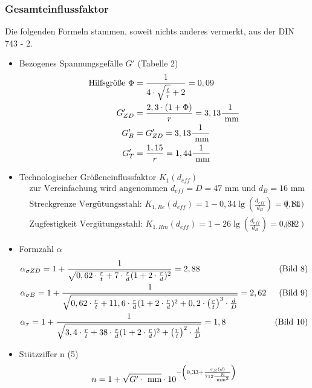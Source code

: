 \subsubsection{Gesamteinflussfaktor}
Die folgenden Formeln stammen, soweit nichts anderes vermerkt, aus der DIN 743 - 2.
\begin{itemize}
\item Bezogenes Spannungsgefälle $G'$ \hfill (Tabelle 2)
	\begin{align*}
		\text{Hilfsgröße } \Phi &= \frac{1}{4 \cdot \sqrt{\frac{t}{r}} +2} = 0,09 \\
		G'_{ZD} &= \frac{2,3 \cdot (1+\Phi)}{r} = 3,13 \frac{1}{\text{ mm}} \\
		G'_{B}&= G'_{ZD}  =3,13 \frac{1}{\text{ mm}} \\
		G'_{T}&= \frac{1,15}{r} = 1,44\frac{1}{\text{ mm}} 
	\end{align*}
\item Technologischer Größeneinflussfaktor $K_1 (d_{eff})$ 
	\begin{align*}
		&\text{zur Vereinfachung wird angenommen } d_{eff} = D =47 \text{ mm und } d_B = 16 \text{ mm} \\ 
		&\text{Streckgrenze Vergütungsstahl: }K_{1,Re}(d_{eff}) = 1 - 0,34 \lg \left( \frac{d_{eff}}{d_B} \right) = 0,84  &(14) \\
		&\text{Zugfestigkeit Vergütungsstahl: } K_{1,Rm}(d_{eff}) = 1 - 26 \lg \left( \frac{d_{eff}}{d_B} \right) = 0,88  &(12) 
	\end{align*}
\item Formzahl $\alpha$
	\begin{align*}
		&\alpha_{\sigma ZD} = 1 + \frac{1}{\sqrt{0,62 \cdot \frac{r}{t} + 7 \cdot \frac{r}{d} (1+2 \cdot \frac{r}{d})^2}} = 2,88 & \text{(Bild 8)} \\
		&\alpha_{\sigma B} = 1 + \frac{1}{\sqrt{0,62 \cdot \frac{r}{t} + 11,6 \cdot \frac{r}{d} (1+2 \cdot \frac{r}{d})^2 + 0,2 \cdot \left( \frac{r}{t} \right) ^3 \cdot \frac{d}{D}}} = 2,62 & \text{(Bild 9)} \\
		&\alpha_{\tau} = 1 + \frac{1}{\sqrt{3,4 \cdot \frac{r}{t} + 38 \cdot \frac{r}{d} (1+2 \cdot \frac{r}{d})^2 + \left( \frac{r}{t} \right) ^2 \cdot \frac{d}{D}}} = 1,8  & \text{(Bild 10)} 
	\end{align*}
\item Stützziffer n \hfill (5)
	\begin{align*}
		n&= 1 + \sqrt{G' \x \text{ mm}} \x 10 ^{-\left( 0,33 + \frac{\sigma_S (d)}{712\frac{\text{ N}}{\text{ mm}^2}} \right)} \\

\end{align*}
\end{itemize}
